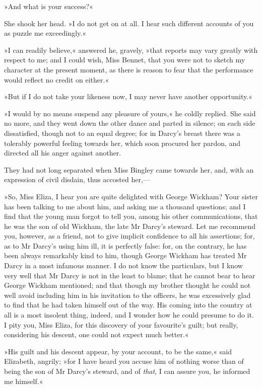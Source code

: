 »And what is your success?«

She shook her head. »I do not get on at all. I hear such different accounts of you as puzzle me exceedingly.«

»I can readily believe,« answered he, gravely, »that reports may vary greatly with respect to me; and I could wish, Miss Bennet, that you were not to sketch my character at the present moment, as there is reason to fear that the performance would reflect no credit on either.«

»But if I do not take your likeness now, I may never have another opportunity.«

»I would by no means suspend any pleasure of yours,« he coldly replied. She said no more, and they went down the other dance and parted in silence; on each side dissatisfied, though not to an equal degree; for in Darcy's breast there was a tolerably powerful feeling towards her, which soon procured her pardon, and directed all his anger against another.

They had not long separated when Miss Bingley came towards her, and, with an expression of civil disdain, thus accosted her,—

»So, Miss Eliza, I hear you are quite delighted with George Wickham? Your sister has been talking to me about him, and asking me a thousand questions; and I find that the young man forgot to tell you, among his other communications, that he was the son of old Wickham, the late Mr Darcy's steward. Let me recommend you, however, as a friend, not to give implicit confidence to all his assertions; for, as to Mr Darcy's using him ill, it is perfectly false: for, on the contrary, he has been always remarkably kind to him, though George Wickham has treated Mr Darcy in a most infamous manner. I do not know the particulars, but I know very well that Mr Darcy is not in the least to blame; that he cannot bear to hear George Wickham mentioned; and that though my brother thought he could not well avoid including him in his invitation to the officers, he was excessively glad to find that he had taken himself out of the way. His coming into the country at all is a most insolent thing, indeed, and I wonder how he could presume to do it. I pity you, Miss Eliza, for this discovery of your favourite's guilt; but really, considering his descent, one could not expect much better.«

»His guilt and his descent appear, by your account, to be the same,« said Elizabeth, angrily; »for I have heard you accuse him of nothing worse than of being the son of Mr Darcy's steward, and of \textit{that}, I can assure you, he informed me himself.«

